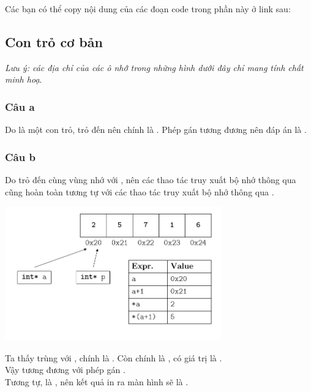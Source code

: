\documentclass[main.tex]{subfiles}
\begin{document}
Các bạn có thể copy nội dung của các đoạn code trong phần này ở link sau: 
\subsection{Con trỏ cơ bản}
\textit{Lưu ý: các địa chỉ của các ô nhớ trong những hình dưới đây chỉ mang tính chất minh hoạ}.

\subsubsection{Câu a}
Do  là một con trỏ, trỏ đến  nên  chính là . Phép gán  tương đương  nên đáp án là .

\subsubsection{Câu b}
Do  trỏ đến cùng vùng nhớ với , nên các thao tác truy xuất bộ nhớ thông qua  cũng hoàn toàn tương tự với các thao tác truy xuất bộ nhớ thông qua .

\begin{center}
\includegraphics[width=0.7\textwidth]{image/ans_CTRLCB_b.png}
\end{center}

Ta thấy  trùng với , chính là . Còn  chính là , có giá trị là .\\
Vậy  tương đương với phép gán .\\
Tương tự,  là , nên kết quả in ra màn hình sẽ là .
\end{document}
